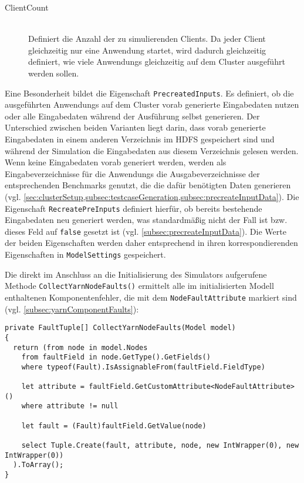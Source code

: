 \begin{description}
    \item[ClientCount] \hfill \\
        Definiert die Anzahl der zu simulierenden Clients.
        Da jeder Client gleichzeitig nur eine \gls{Anwendung} startet, wird dadurch gleichzeitig definiert, wie viele \glspl{Anwendung} gleichzeitig auf dem Cluster ausgeführt werden sollen.
\end{description}

Eine Besonderheit bildet die Eigenschaft \texttt{PrecreatedInputs}.
Es definiert, ob die ausgeführten \glspl{Anwendung} auf dem Cluster vorab generierte Eingabedaten nutzen oder alle Eingabedaten während der Ausführung selbst generieren.
Der Unterschied zwischen beiden Varianten liegt darin, dass vorab generierte Eingabedaten in einem anderen Verzeichnis im \gls{HDFS} gespeichert sind und während der Simulation die Eingabedaten aus diesem Verzeichnis gelesen werden.
Wenn keine Eingabedaten vorab generiert werden, werden als Eingabeverzeichnisse für die \glspl{Anwendung} die Ausgabeverzeichnisse der entsprechenden Benchmarks genutzt, die die dafür benötigten Daten generieren (vgl. \cref{sec:clusterSetup,subsec:testcaseGeneration,subsec:precreateInputData}).
Die Eigenschaft \texttt{RecreatePreInputs} definiert hierfür, ob bereits bestehende Eingabedaten neu generiert werden, was standardmäßig nicht der Fall ist bzw. dieses Feld auf \texttt{false} gesetzt ist (vgl. \cref{subsec:precreateInputData}).
Die Werte der beiden Eigenschaften werden daher entsprechend in ihren korrespondierenden Eigenschaften in \texttt{ModelSettings} gespeichert.

Die direkt im Anschluss an die Initialisierung des Simulators aufgerufene Methode \texttt{CollectYarnNodeFaults()} ermittelt alle im initialisierten Modell enthaltenen Komponentenfehler, die mit dem \texttt{NodeFaultAttribute} markiert sind (vgl. \cref{subsec:yarnComponentFaults}):

\begin{lstlisting}[label=lst:hadoopSimulationCollectFaults,style=cs,
caption={[Ermitteln der Komponentenfehler mit dem NodeFaultAttribute]
    Ermitteln der Komponentenfehler mit dem \texttt{NodeFaultAttribute}}]
private FaultTuple[] CollectYarnNodeFaults(Model model)
{
  return (from node in model.Nodes      
    from faultField in node.GetType().GetFields()
    where typeof(Fault).IsAssignableFrom(faultField.FieldType)
    
    let attribute = faultField.GetCustomAttribute<NodeFaultAttribute>()
    where attribute != null
    
    let fault = (Fault)faultField.GetValue(node)
    
    select Tuple.Create(fault, attribute, node, new IntWrapper(0), new IntWrapper(0))
  ).ToArray();
}
\end{lstlisting}

